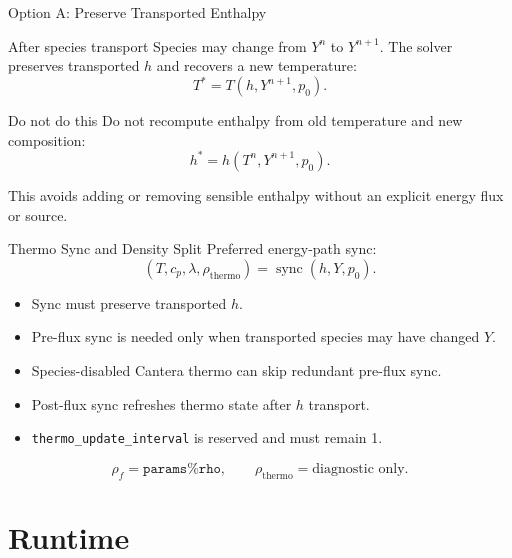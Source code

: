 \documentclass[aspectratio=169,11pt]{beamer}
\begin{document}
\begin{frame}{Option A: Preserve Transported Enthalpy}
  \begin{block}{After species transport}
    Species may change from \(Y^n\) to \(Y^{n+1}\). The solver preserves
    transported \(h\) and recovers a new temperature:
    \[
      T^{*} = T(h,Y^{n+1},p_0).
    \]
  \end{block}

  \begin{alertblock}{Do not do this}
    Do not recompute enthalpy from old temperature and new composition:
    \[
      h^{*} = h(T^n,Y^{n+1},p_0).
    \]
  \end{alertblock}

  This avoids adding or removing sensible enthalpy without an explicit energy
  flux or source.
\end{frame}

\begin{frame}{Thermo Sync and Density Split}
  Preferred energy-path sync:
  \[
    (T,c_p,\lambda,\rho_{\mathrm{thermo}})
    =
    \operatorname{sync}(h,Y,p_0).
  \]

  \begin{itemize}
    \item Sync must preserve transported \(h\).
    \item Pre-flux sync is needed only when transported species may have changed
          \(Y\).
    \item Species-disabled Cantera thermo can skip redundant pre-flux sync.
    \item Post-flux sync refreshes thermo state after \(h\) transport.
    \item \texttt{thermo\_update\_interval} is reserved and must remain 1.
  \end{itemize}

  \[
    \rho_f = \texttt{params\%rho},
    \qquad
    \rho_{\mathrm{thermo}} = \text{diagnostic only}.
  \]
\end{frame}

\section{Runtime}
\end{document}
